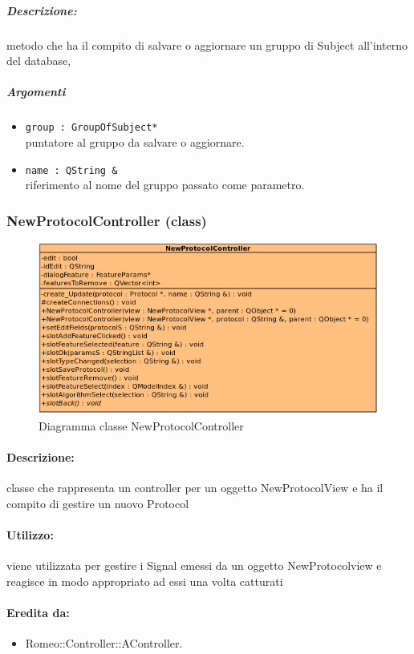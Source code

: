 \begin{itemize}
			\color{black}
			\subparagraph{Descrizione:} metodo che ha il compito di salvare o aggiornare un gruppo di Subject\g{} all'interno del database,
			\color{black}
			\subparagraph{Argomenti}
			\begin{itemize}
				\item \color{RoyalPurple} \verb!group : GroupOfSubject*!\\				
\color{black} puntatore al gruppo da salvare o aggiornare.
				\item \color{RoyalPurple} \verb!name : QString &!\\				
\color{black} riferimento al nome del gruppo passato come parametro.
			\end{itemize}
		\end{itemize}
		\pagebreak
	\subsubsection{NewProtocolController (class)}
	\begin{figure}[!h]
		\centering
		\includegraphics[width=0.75\linewidth]{./Content/Immagini/controller/NewProtocolController.png}
		\caption{Diagramma classe NewProtocolController}
	\end{figure}
	\paragraph{Descrizione:} classe che rappresenta un controller per un oggetto NewProtocolView e ha il compito di gestire un nuovo Protocol\g{}
	\paragraph{Utilizzo:} viene utilizzata per gestire i Signal\g{} emessi da un oggetto NewProtocolview e reagisce in modo appropriato ad essi una volta catturati
	\paragraph{Eredita da:}
		\begin{itemize}
			\item Romeo::Controller::AController.
		\end{itemize}
